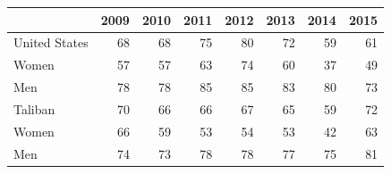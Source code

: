 \begin{tabular}{lrrrrrrr}
\toprule
 & 2009 & 2010 & 2011 & 2012 & 2013 & 2014 & 2015 \\
\midrule
United States & 68 & 68 & 75 & 80 & 72 & 59 & 61 \\
\quad Women & 57 & 57 & 63 & 74 & 60 & 37 & 49 \\
\quad Men & 78 & 78 & 85 & 85 & 83 & 80 & 73 \\
\midrule
Taliban & 70 & 66 & 66 & 67 & 65 & 59 & 72 \\
\quad Women & 66 & 59 & 53 & 54 & 53 & 42 & 63 \\
\quad Men & 74 & 73 & 78 & 78 & 77 & 75 & 81 \\
\bottomrule
\end{tabular}
